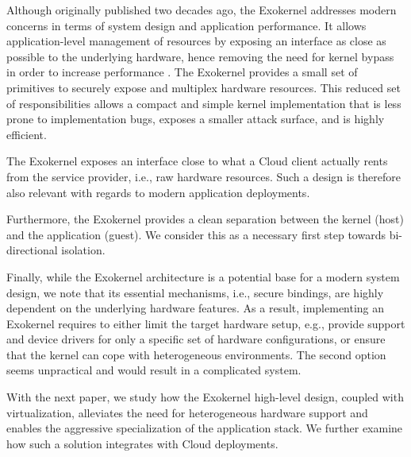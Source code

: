 Although originally published two decades ago, the Exokernel addresses modern concerns in terms of system design and application performance.
It allows application-level management of resources by exposing an interface as close as possible to the underlying hardware, hence removing the need for kernel bypass in order to increase performance \cite{BelayPKGKB14,DBLP:journals/tocs/CaoFKL96}.
The Exokernel provides a small set of primitives to securely expose and multiplex hardware resources.
This reduced set of responsibilities allows a compact and simple kernel implementation that is less prone to implementation bugs, exposes a smaller attack surface, and is highly efficient.

The Exokernel exposes an interface close to what a Cloud client actually rents from the service provider, i.e., raw hardware resources.
Such a design is therefore also relevant with regards to modern application deployments. 

Furthermore, the Exokernel provides a clean separation between the kernel (host) and the application (guest).
We consider this as a necessary first step towards bi-directional isolation.

Finally, while the Exokernel architecture is a potential base for a modern system design, we note that its essential mechanisms, i.e., secure bindings, are highly dependent on the underlying hardware features.
As a result, implementing an Exokernel requires to either limit the target hardware setup, e.g., provide support and device drivers for only a specific set of hardware configurations, or ensure that the kernel can cope with heterogeneous environments.
The second option seems unpractical and would result in a complicated system.

With the next paper, we study how the Exokernel high-level design, coupled with virtualization, alleviates the need for heterogeneous hardware support and enables the aggressive specialization of the application stack.
We further examine how such a solution integrates with Cloud deployments.



